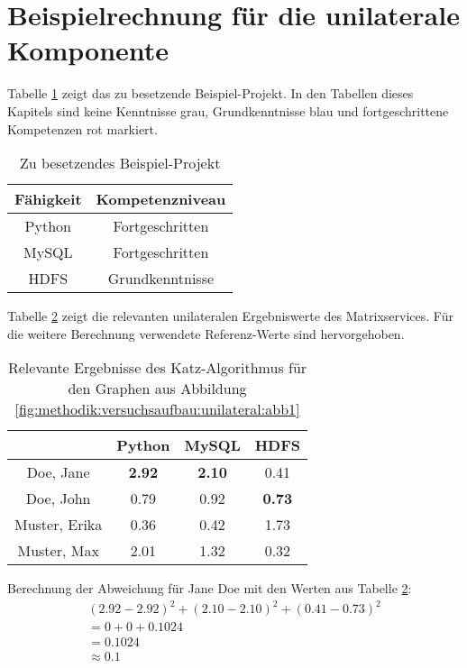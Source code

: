 \section{Beispielrechnung für die unilaterale Komponente}
\label{ch:nebenrechnungen:unilateral}
Tabelle \ref{tbl:berechnungDerKatzZentralitaetPseudoMitarbeiter:tbl1} zeigt das zu besetzende Beispiel-Projekt. In den Tabellen dieses Kapitels sind keine Kenntnisse grau, Grundkenntnisse blau und fortgeschrittene Kompetenzen rot markiert.
\begin{table}[h]
	\centering
	\begin{tabular}{c|c}
		Fähigkeit & Kompetenzniveau \\
		\hline
		Python  & \cellcolor{usercolor}Fortgeschritten\\
		MySQL   & \cellcolor{usercolor}Fortgeschritten\\
		HDFS    & \cellcolor{itemcolor}Grundkenntnisse
	\end{tabular}
	\caption{Zu besetzendes Beispiel-Projekt}
	\label{tbl:berechnungDerKatzZentralitaetPseudoMitarbeiter:tbl1}
\end{table}

Tabelle \ref{tbl:berechnungDerKatzZentralitaetPseudoMitarbeiter:tbl2} zeigt die relevanten unilateralen Ergebniswerte des Matrixservices. Für die weitere Berechnung verwendete Referenz-Werte sind hervorgehoben.

\begin{table}[h]
	\centering
	\begin{tabular}{c|c|c|c}
		& Python & MySQL & HDFS\\ 
		\hline
		Doe, Jane     & \cellcolor{usercolor}\textbf{2.92} & \cellcolor{itemcolor}\textbf{2.10} & \cellcolor{exxetagray}0.41\\
		Doe, John     & \cellcolor{exxetagray}0.79 & \cellcolor{itemcolor}0.92 & \cellcolor{itemcolor}\textbf{0.73}\\
		Muster, Erika & \cellcolor{exxetagray}0.36 & \cellcolor{exxetagray}0.42 & \cellcolor{usercolor}1.73\\
		Muster, Max   & \cellcolor{itemcolor}2.01 & \cellcolor{itemcolor}1.32 & \cellcolor{exxetagray}0.32
	\end{tabular}
	\caption{Relevante Ergebnisse des Katz-Algorithmus für den Graphen aus Abbildung \ref{fig:methodik:versuchsaufbau:unilateral:abb1}}
	\label{tbl:berechnungDerKatzZentralitaetPseudoMitarbeiter:tbl2}
\end{table}

Berechnung der Abweichung für Jane Doe mit den Werten aus Tabelle \ref{tbl:berechnungDerKatzZentralitaetPseudoMitarbeiter:tbl2}:
\begin{gather}
	\nonumber (2.92-2.92)^2 + (2.10-2.10)^2 + (0.41-0.73)^2\\
	\nonumber = 0 + 0 + 0.1024\\
	\nonumber = 0.1024\\
	\approx 0.1
	\label{frml:nebenrechnungen:unilateral:jane}
\end{gather}

